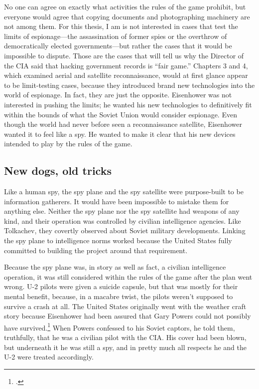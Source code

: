 \documentclass{report}
\begin{document}
No one can agree on exactly what activities the rules of the game prohibit, but everyone would agree that copying documents and photographing machinery are not among them. For this thesis, I am is not interested in cases that test the limits of espionage---the assassination of former spies or the overthrow of democratically elected governments---but rather the cases that it would be impossible to dispute. Those are the cases that will tell us why the Director of the CIA said that hacking government records is ``fair game.'' Chapters 3 and 4, which examined aerial and satellite reconnaissance, would at first glance appear to be limit-testing cases, because they introduced brand new technologies into the world of espionage. In fact, they are just the opposite. Eisenhower was not interested in pushing the limits; he wanted his new technologies to definitively fit within the bounds of what the Soviet Union would consider espionage. Even though the world had never before seen a reconnaissance satellite, Eisenhower wanted it to feel like a spy. He wanted to make it clear that his new devices intended to play by the rules of the game.

\subsection{New dogs, old tricks}
Like a human spy, the spy plane and the spy satellite were purpose-built to be information gatherers. It would have been impossible to mistake them for anything else. Neither the spy plane nor the spy satellite had weapons of any kind, and their operation was controlled by civilian intelligence agencies. Like Tolkachev, they covertly observed about Soviet military developments. Linking the spy plane to intelligence norms worked because the United States fully committed to building the project around that requirement.

Because the spy plane was, in story as well as fact, a civilian intelligence operation, it was still considered within the rules of the game after the plan went wrong. U-2 pilots were given a suicide capsule, but  that was mostly for their mental benefit, because, in a macabre twist, the pilots weren't supposed to survive a crash at all. The United States originally went with the weather craft story because Eisenhower had been assured that Gary Powers could not possibly have survived.\footcite[p.~35]{lindgren_trust_2000} When Powers confessed to his Soviet captors, he told them, truthfully, that he was a civilian pilot with the CIA. His cover had been blown, but underneath it he was still a spy, and in pretty much all respects he and the U-2 were treated accordingly.
\end{document}

